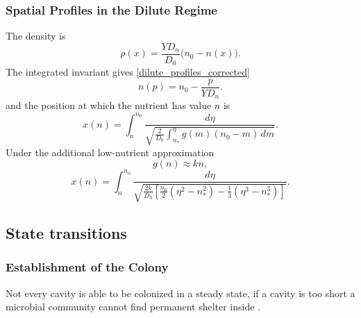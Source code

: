 \documentclass[11pt,a4paper]{report}
\begin{document}
	\subsubsection{Spatial Profiles in the Dilute Regime}	
	The density is \begin{equation}
		{
			\rho(x)=\frac{YD_n}{D_0}\bigl(n_0-n(x)\bigr).
		}
	\end{equation}
	The integrated invariant gives \ref{dilute_profiles_corrected}	
	\begin{equation}
		n(p)=n_0-\frac{p}{YD_n}.
	\end{equation}	
and	the position at which the nutrient has value $n$ is
	\begin{equation}
		{
			x(n)
			=
			\int_n^{n_0}
			\frac{d\eta}
			{
				\sqrt{
					\frac{2}{D_0}
					\int_{n_*}^{\eta}
					g(m)(n_0-m)\,dm
				}
			}.
		}
		\label{eq:x_of_n_dilute_full}
	\end{equation}
	Under the additional low-nutrient approximation
\[
g(n)\approx kn,
\]
	\begin{equation}
	{
		x(n)
		=
		\int_n^{n_0}
		\frac{d\eta}
		{
			\sqrt{
				\frac{2k}{D_0}
				\left[
				\frac{n_0}{2}(\eta^2-n_*^2)
				-
				\frac{1}{3}(\eta^3-n_*^3)
				\right]
			}
		}.
	}
	\label{eq:x_of_n_dilute_linear}
\end{equation}

	\subsection{State transitions}
	\subsubsection{Establishment of the Colony}
	Not every cavity is able to be colonized in a steady state, if a cavity is too short a microbial community cannot find permanent shelter inside \cite{Karita}.
\end{document}
